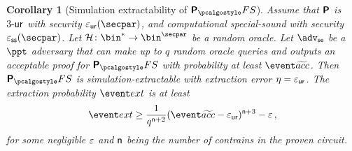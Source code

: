 \let\accentvec\vec \documentclass[runningheads,10pt]{llncs}
\newtheorem{corollary}[theorem]{Corollary} \theoremstyle{definition}
\begin{document}
\begin{corollary}[Simulation extractability of $\plonkprot_\fs$]
	\label{thm:plonkprotfs_se}
	Assume that  $\bm{\mathsf{P}}$ is ${3\text{-}\mathsf{ur}}$ with security $\epsur(\secpar)$, and computational special-sound with security $\epsss(\secpar)$.
	Let $\ro\colon \bin^* \to \bin^\secpar$ be a random oracle. 
	Let $\advse$ be a $\ppt$ adversary that can make up to $q$ random oracle queries and outputs an acceptable proof for $\plonkprotfs$ with probability at least $\waccProb$.
	Then $\plonkprotfs$ is simulation-extractable with extraction error $\eta = \varepsilon_{\mathsf{ur}}$. The extraction probability $\extProb$ is at least
	\[
		\extProb \geq \frac{1}{q^{\numberofconstrains + 2}} (\waccProb - \epsur)^{\numberofconstrains + 3} -\eps\,,
	\]
	for some negligible $\varepsilon$ and $\mathsf{n}$ being the number of contrains in the proven circuit.
\end{corollary}
\end{document}

